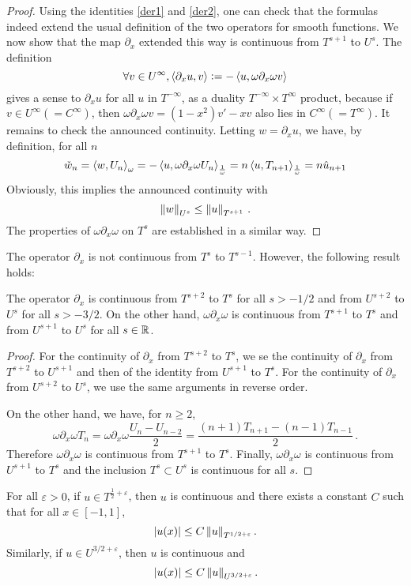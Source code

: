 \documentclass[a4paper]{article}
\begin{document}
\begin{proof}
	Using the identities \eqref{der1} and \eqref{der2}, one can check that the formulas indeed extend the usual definition of the two operators for smooth functions. We now show that the map $\partial_x$ extended this way is continuous from $T^{s+1}$ to $U^s$. The definition 
	\[\forall v \in U^{\infty}, \left\langle \partial_x u,v\right\rangle \mathrel{\mathop:}= -\left\langle u,\omega \partial_x \omega v\right\rangle\]
	gives a sense to $\partial_x u$ for all $u$ in $T^{-\infty}$, as a duality $T^{-\infty} \times T^{\infty}$ product, because if $v \in U^{\infty} (= C^{\infty})$, then $\omega \partial_x \omega v = (1-x^2)v' - xv$ also lies in $C^{\infty} (= T^\infty)$. It remains to check the announced continuity. Letting $w = \partial_x u$, we have, by definition, for all $n$
	\[\check{w}_n = \left\langle w,U_n\right\rangle_{\omega} = - \left\langle u,\omega \partial_x \omega U_n\right\rangle_\frac{1}{\omega} = n \left\langle u,T_{n+1}\right\rangle_\frac{1}{\omega} = n\hat{u}_{n+1}\]
	Obviously, this implies the announced continuity with
	\[ \left\|w\right\|_{U^s} \leq \left\|u\right\|_{T^{s+1}}\,.\]
	The properties of $\omega \partial_x \omega$ on $T^s$ are established in a similar way. 
\end{proof}
The operator $\partial_x$ is not continuous from $T^s$ to $T^{s-1}$. However, the following result holds:
\begin{Cor}
	\label{corDxT2T0}
	The operator $\partial_x$ is continuous from $T^{s+2}$ to $T^s$ for all $s > -1/2 $ and from $U^{s+2}$ to $U^s$ for all $s > - 3/2$. On the other hand, $\omega \partial_x \omega$ is continuous from $T^{s+1}$ to $T^s$ and from $U^{s+1}$ to $U^s$ for all $s \in \mathbb{R}$. 
\end{Cor}
\begin{proof}
	For the continuity of $\partial_x$ from $T^{s+2}$ to $T^s$, we se the continuity of $\partial_x$ from $T^{s+2}$ to $U^{s+1}$ and then of the identity from $U^{s+1}$ to $T^s$. For the continuity of $\partial_x$ from $U^{s+2}$ to $U^s$, we use the same arguments in reverse order. 
	
	On the other hand, we have, for $n \geq 2$,
	\[\omega \partial_x \omega T_n = \omega\partial_x \omega \frac{U_n - U_{n-2}}{2} = \frac{(n+1)T_{n+1} - (n-1)T_{n-1}}{2}\,.\]
	Therefore $\omega \partial_x \omega$ is continuous from $T^{s+1}$ to $T^s$. Finally, $\omega \partial_x \omega$ is continuous from $U^{s+1}$ to $T^s$ and the inclusion $T^s \subset U^s$ is continuous for all $s$.   
\end{proof}
\begin{Lem}
	\label{LemInjectionsContinues}
	For all $\varepsilon >0$, if $u \in T^{\frac{1}{2} + \varepsilon}$, then $u$ is continuous and there exists a constant $C$ such that for all $x \in [-1,1]$,
	\[ \left\lvert u(x) \right\rvert \leq C \left\|u\right\|_{T^{1/2 + \varepsilon}}.\]	
	Similarly, if $u \in U^{3/2 + \varepsilon}$, then $u$ is continuous and 
	\[ \left\lvert u(x) \right\rvert \leq C \left\|u\right\|_{U^{3/2 + \varepsilon}}.\]
\end{Lem}
\end{document}
